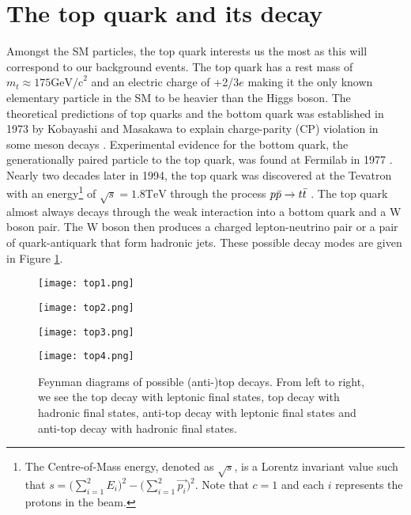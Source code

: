 \section{The top quark and its decay}
Amongst the SM particles, the top quark interests us the most as this will correspond to our background events.  The top quark has a rest mass of $m_t\approx175\text{GeV/c}^2$ and an electric charge of +2/3$e$ \cite{tanabashi2018review} making it the only known elementary particle in the SM to be heavier than the Higgs boson. The theoretical predictions of top quarks and the bottom quark was established in 1973 by Kobayashi and Masakawa to explain charge-parity (CP) violation in some meson decays \cite{griffiths2008introduction, kobayashi1973cp}. Experimental evidence for the bottom quark, the generationally paired particle to the top quark, was found at Fermilab in 1977 \cite{herb1977observation}. Nearly two decades later in 1994, the top quark was discovered at the Tevatron with an energy\footnote{The Centre-of-Mass energy, denoted as $\sqrt{s}$, is a Lorentz invariant value such that $s=\Big( \sum\limits_{i=1}^2 E_i \Big)^2 - \Big( \sum\limits_{i=1}^2 \overrightarrow{p_i} \Big)^2 $. Note that $c=1$ and each $i$ represents the protons in the beam.} of $\sqrt{s}=1.8\text{TeV}$ through the process $p\Bar{p} \rightarrow t\Bar{t}$ \cite{abachi1994search, coll1994evidence, abachi1995observation}. The top quark almost always decays through the weak interaction into a bottom quark and a W boson pair. The W boson then produces a charged lepton-neutrino pair or a pair of quark-antiquark that form hadronic jets. These possible decay modes are given in Figure \ref{fig:topdecay}. \\

\begin{figure}[htbp]
    \centering
    \begin{minipage}{0.24\linewidth}
        \texttt{[image: top1.png]}
        \label{fig:top1}
    \end{minipage}
    \begin{minipage}{0.24\linewidth}
        \texttt{[image: top2.png]}
        \label{fig:anttop1}
    \end{minipage}
    \begin{minipage}{0.24\linewidth}
        \texttt{[image: top3.png]}
        \label{fig:top2}
    \end{minipage}
    \begin{minipage}{0.24\linewidth}
        \texttt{[image: top4.png]}
        \label{fig:anttop2}
    \end{minipage}
    \caption{Feynman diagrams of possible (anti-)top decays. From left to right, we see the top decay with leptonic final states, top decay with hadronic final states, anti-top decay with leptonic final states and anti-top decay with hadronic final states.}
    \label{fig:topdecay}
\end{figure}

